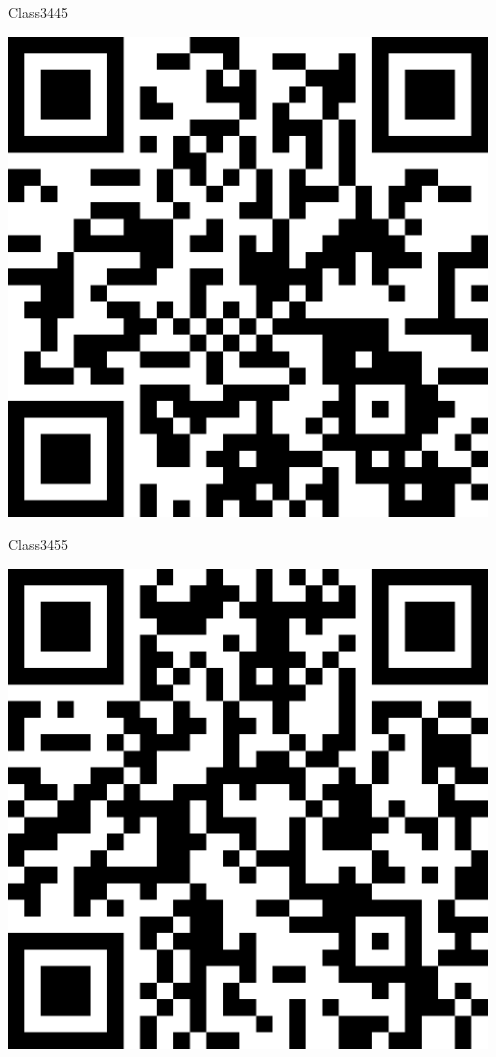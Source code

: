 \documentclass[letterpaper]{article}
\begin{document}
 \hfill{\small Class3445} 

 \vspace{1in} 
 \pagebreak 
{} 
 \vspace*{\fill} 
 \begingroup 
 \centerline{\includegraphics[scale=1,width=5in,height=5in]{Class3455.png}} 
 \endgroup 
 \vspace*{\fill} 

 \hfill{\small Class3455} 

 \vspace{1in} 
 \pagebreak 
{} 
 \vspace*{\fill} 
 \begingroup 
 \centerline{\includegraphics[scale=1,width=5in,height=5in]{Class3510.png}} 
 \endgroup 
 \vspace*{\fill} 
\end{document}
